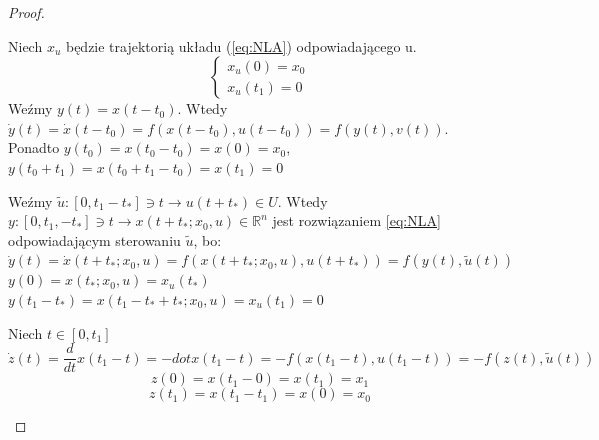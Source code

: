\begin{lemma}{}{}
    \begin{proof}{}{}
        \begin{ad}{}{}
            Niech $x_u$ będzie trajektorią układu (\ref{eq:NLA}) odpowiadającego u. $$\begin{cases}
                x_u(0) = x_0 \\
                x_u(t_1) = 0
            \end{cases}$$
            Weźmy $y(t) = x(t - t_0)$. Wtedy $\dot{y}(t) = \dot{x}(t - t_0) = f(x(t - t_0), u(t - t_0)) = f(y(t), v(t))$. \\
            Ponadto $y(t_0) = x(t_0 - t_0) = x(0) = x_0$, $y(t_0 + t_1) = x(t_0 + t_1 - t_0) = x(t_1) = 0$
        \end{ad}
        \begin{ad}{}{}
            Weźmy $\tilde{u} \colon [0, t_1 - t_*] \ni t \to u(t + t_*) \in U$. Wtedy $y \colon [0, t_1, - t_*] \ni t \to x(t + t_*; x_0, u) \in \mathbb{R}^n$ jest rozwiązaniem \ref{eq:NLA} odpowiadającym sterowaniu $\tilde{u}$, bo: \\
            $\dot{y}(t) = \dot{x}(t + t_*; x_0, u) = f(x(t + t_*; x_0, u), u(t + t_*)) = f(y(t), \tilde{u}(t))$ \\
            $y(0) = x(t_*; x_0, u) = x_u(t_*)$ \\
            $y(t_1 - t_*) = x(t_1 - t_* + t_*; x_0, u) = x_u(t_1) = 0$
        \end{ad}
        \begin{ad}{}{}
            Niech $t \in [0, t_1]$
            $$\dot{z}(t) = \frac{d}{dt} x(t_1 - t) = -dot{x}(t_1 - t) = - f (x(t_1 - t), u(t_1 - t)) = - f(z(t), \tilde{u}(t))$$
            $$z(0) = x(t_1 - 0) = x(t_1) = x_1$$
            $$z(t_1) = x(t_1 - t_1) = x(0) = x_0$$
        \end{ad}
    \end{proof}
\end{lemma}

